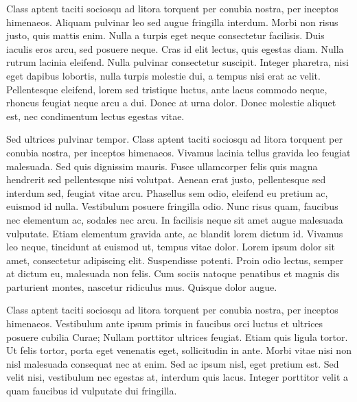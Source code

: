 \documentclass[11pt,a4paper,oneside]{book}
\begin{document}
Class aptent taciti sociosqu ad litora torquent per conubia nostra, per inceptos himenaeos. Aliquam pulvinar leo sed augue fringilla interdum. Morbi non risus justo,
quis mattis enim. Nulla a turpis eget neque consectetur facilisis. Duis iaculis eros arcu, sed posuere neque. Cras id elit lectus, quis egestas diam. Nulla rutrum
lacinia eleifend. Nulla pulvinar consectetur suscipit. Integer pharetra, nisi eget dapibus lobortis, nulla turpis molestie dui, a tempus nisi erat ac velit. Pellentesque
eleifend, lorem sed tristique luctus, ante lacus commodo neque, rhoncus feugiat neque arcu a dui. Donec at urna dolor. Donec molestie aliquet est, nec condimentum lectus
egestas vitae.

Sed ultrices pulvinar tempor. Class aptent taciti sociosqu ad litora torquent per conubia nostra, per inceptos himenaeos. Vivamus lacinia tellus gravida leo feugiat
malesuada. Sed quis dignissim mauris. Fusce ullamcorper felis quis magna hendrerit sed pellentesque nisi volutpat. Aenean erat justo, pellentesque sed interdum sed,
feugiat vitae arcu. Phasellus sem odio, eleifend eu pretium ac, euismod id nulla. Vestibulum posuere fringilla odio. Nunc risus quam, faucibus nec elementum ac, sodales
nec arcu. In facilisis neque sit amet augue malesuada vulputate. Etiam elementum gravida ante, ac blandit lorem dictum id. Vivamus leo neque, tincidunt at euismod ut,
tempus vitae dolor. Lorem ipsum dolor sit amet, consectetur adipiscing elit. Suspendisse potenti. Proin odio lectus, semper at dictum eu, malesuada non felis. Cum sociis
natoque penatibus et magnis dis parturient montes, nascetur ridiculus mus. Quisque dolor augue.

Class aptent taciti sociosqu ad litora torquent per conubia nostra, per inceptos himenaeos. Vestibulum ante ipsum primis in faucibus orci luctus et ultrices
posuere cubilia Curae; Nullam porttitor ultrices feugiat. Etiam quis ligula tortor. Ut felis tortor, porta eget venenatis eget, sollicitudin in ante. Morbi
vitae nisi non nisl malesuada consequat nec at enim. Sed ac ipsum nisl, eget pretium est. Sed velit nisi, vestibulum nec egestas at, interdum quis lacus.
Integer porttitor velit a quam faucibus id vulputate dui fringilla.
\end{document}
